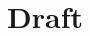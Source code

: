 \documentclass[nolinenumbers,preprint2,tighten]{aastex631}
\begin{document}
\begin{CJK*}{UTF8}{gbsn}

\title{Draft}






\end{CJK*}
\end{document}
